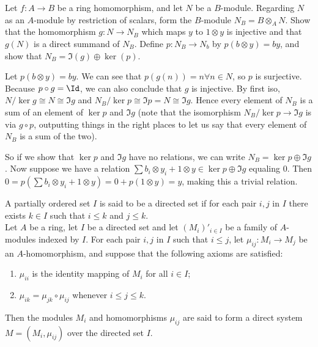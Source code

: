 \begin{questions}
	\question Let $f: A\to B$ be a ring homomorphism, and let $N$ be a $B$-module. Regarding $N$ as an $A$-module by restriction of scalars, form the $B$-module $N_B = B \otimes _A N$. Show that the homomorphism $g: N \to N_B$ which maps $y$ to $1 \otimes  y$ is injective and that $g(N)$ is a direct summand of $N_B$.
	\ifhint
		Define $p: N_B \to N_b$ by $p(b \otimes y) = by $, and show that $N_B = \Im (g) \oplus \ker (p)$.
	\fi
	\begin{solution}
		Let $p(b \otimes y) = by $.
		We can see that $p(g(n)) = n \forall n \in N $, so $p $ is surjective.
		Because $p\circ g = \Id $, we can also conclude that $g $ is injective.
		By first iso, $N / \ker g \cong N \cong \Im g $ and $N_B / \ker p \cong \Im p = N \cong \Im g $.
		Hence every element of $N_B $ is a sum of an element of $\ker p $ and $\Im g $ (note that the isomorphism $N_B / \ker p \to \Im g $ is via $g\circ p $, outputting things in the right places to let us say that every element of $N_B $ is a sum of the two).

		So if we show that $\ker p $ and $\Im g $ have no relations, we can write $N_B = \ker p \oplus \Im g $.
		Now suppose we have a relation $\sum b_i \otimes y_i + 1 \otimes y \in \ker p \oplus \Im g$ equaling 0.
		Then $0 = p(\sum b_i \otimes y_i + 1 \otimes y) = 0 + p(1 \otimes y) = y$, making this a trivial relation.
	\end{solution}

	\question A partially ordered set $I$ is said to be a directed set if for each pair $i, j$ in $I$ there exists $k \in I$ such that $i\le k$ and $j\le k$.\\
	Let $A$ be a ring, let $I$ be a directed set and let $(M_i)'_{i\in I}$ be a family of $A$-modules indexed by $I$. For each pair $i,j$ in $I$ such that $i \le j $, let $\mu _{ij}: M_i \to M_j$ be an $A$-homomorphism, and suppose that the following axioms are satisfied:
	\begin{enumerate}
		\item $\mu_{ii}$ is the identity mapping of $M_i$ for all $i\in I $;
		\item $\mu _{ik} = \mu _{jk}\circ \mu _{ij}$ whenever $i\le j \le k$.
	\end{enumerate}
	Then the modules $M_i$ and homomorphisms $\mu_{ij}$ are said to form a direct system $M = (M_i, \mu _{ij})$ over the directed set $I$.


\end{questions}
